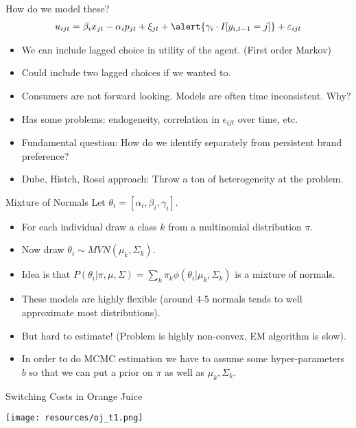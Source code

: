 \begin{frame}{How do we model these?}
\begin{eqnarray*}
u_{ijt} = \beta_i x_{jt} - \alpha_i p_{jt} + \xi_{jt} + \alert{\gamma_i \cdot I[y_{i,t-1}=j]} + \varepsilon_{ijt} 
\end{eqnarray*}
\begin{itemize}
\item We can include \alert{lagged choice} in utility of the agent. (First order Markov)
\item Could include two lagged choices if we wanted to.
\item Consumers are \alert{not} forward looking. Models are often \alert{time inconsistent}. Why?
\item Has some problems: endogeneity, correlation in $\epsilon_{ijt}$ over time, etc.
\item Fundamental question: How do we identify separately from persistent brand preference?
\item Dube, Histch, Rossi approach: Throw a ton of heterogeneity at the problem.
\end{itemize}
\end{frame} 

\begin{frame}{Mixture of Normals}
Let $\theta_i =[\alpha_i,\beta_i,\gamma_i]$.
\begin{itemize}
\item For each individual draw a class $k$ from a multinomial distribution $\pi$.
\item Now draw $\theta_i \sim MVN(\mu_k, \Sigma_k)$.
\item Idea is that $P(\theta_i | \pi,\mu,\Sigma) = \sum_k \pi_k \phi(\theta_i | \mu_k, \Sigma_k)$ is a mixture of normals. \pause
\item These models are highly flexible (around 4-5 normals tends to well approximate most distributions).
\item But hard to estimate! (Problem is highly non-convex, EM algorithm is slow).
\item In order to do MCMC estimation we have to assume some hyper-parameters $b$ so that we can put a prior on $\pi$ as well as $\mu_k,\Sigma_k$.
\end{itemize}
\end{frame} 



\begin{frame}{Switching Costs in Orange Juice}
\begin{center}
\texttt{[image: resources/oj\_t1.png]}
\end{center}
\end{frame}


